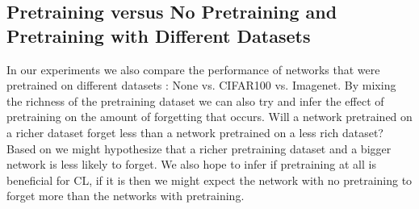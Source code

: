 \subsection{Pretraining versus No Pretraining and Pretraining with Different Datasets}
In our experiments we also compare the performance of networks that were pretrained on different datasets : None vs. CIFAR100 vs. Imagenet. By mixing the richness of the pretraining dataset we can also try and infer the effect of pretraining on the amount of forgetting that occurs. Will a network pretrained on a richer dataset forget less than a network pretrained on a less rich dataset? Based on \cite{ramasesh2022effect} we might hypothesize that a richer pretraining dataset and a bigger network is less likely to forget. We also hope to infer if pretraining at all is beneficial for CL, if it is then we might expect the network with no pretraining to forget more than the networks with pretraining.

